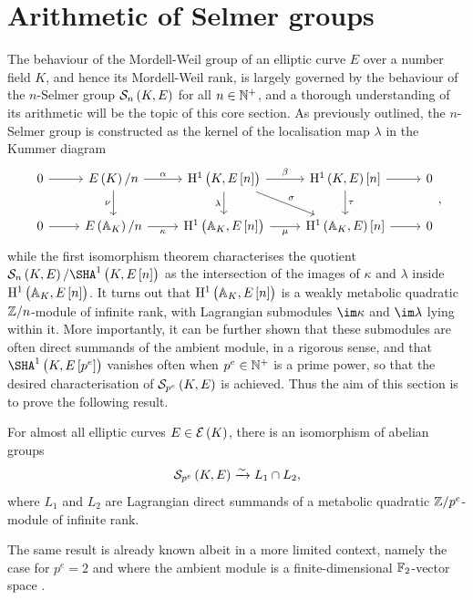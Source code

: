 \section{Arithmetic of Selmer groups}

The behaviour of the Mordell-Weil group of an elliptic curve $ E $ over a number field $ K $, and hence its Mordell-Weil rank, is largely governed by the behaviour of the $ n $-Selmer group $ \Sel[n] $ for all $ n \in \mathbb{N}^+ $, and a thorough understanding of its arithmetic will be the topic of this core section. As previously outlined, the $ n $-Selmer group is constructed as the kernel of the localisation map $ \lambda $ in the Kummer diagram
$$
\begin{tikzcd}
0 \arrow{r} & \En{K} \arrow{r}{\alpha} \arrow{d}[swap]{\nu} & \HE[n]{K} \arrow{r}{\beta} \arrow{d}[swap]{\lambda} \arrow{dr}{\sigma} & \HE{K}\sbr{n} \arrow{r} \arrow{d}{\tau} & 0 \\
0 \arrow{r} & \En{\AA_K} \arrow{r}[swap]{\kappa} & \HE[n]{\AA_K} \arrow{r}[swap]{\mu} & \HE{\AA_K}\sbr{n} \arrow{r} & 0
\end{tikzcd},
$$
while the first isomorphism theorem characterises the quotient $ \Sel[n] / \Sha[K, E\sbr{n}] $ as the intersection of the images of $ \kappa $ and $ \lambda $ inside $ \HE[n]{\AA_K} $. It turns out that $ \HE[n]{\AA_K} $ is a weakly metabolic quadratic $ \mathbb{Z} / n $-module of infinite rank, with Lagrangian submodules $ \im \kappa $ and $ \im \lambda $ lying within it. More importantly, it can be further shown that these submodules are often direct summands of the ambient module, in a rigorous sense, and that $ \Sha[K, E\sbr{p^e}] $ vanishes often when $ p^e \in \mathbb{N}^+ $ is a prime power, so that the desired characterisation of $ \Sel[p^e] $ is achieved. Thus the aim of this section is to prove the following result.

\begin{theorem}
\label{thm:main1}
For almost all elliptic curves $ E \in \EEE\br{K} $, there is an isomorphism of abelian groups
$$ \Sel[p^e] \xrightarrow{\sim} L_1 \cap L_2, $$
where $ L_1 $ and $ L_2 $ are Lagrangian direct summands of a metabolic quadratic $ \mathbb{Z} / p^e $-module of infinite rank.
\end{theorem}

\begin{remark}
The same result is already known albeit in a more limited context, namely the case for $ p^e = 2 $ and where the ambient module is a finite-dimensional $ \mathbb{F}_2 $-vector space \cite[Proposition 1.2.1]{CSS98}.
\end{remark}

